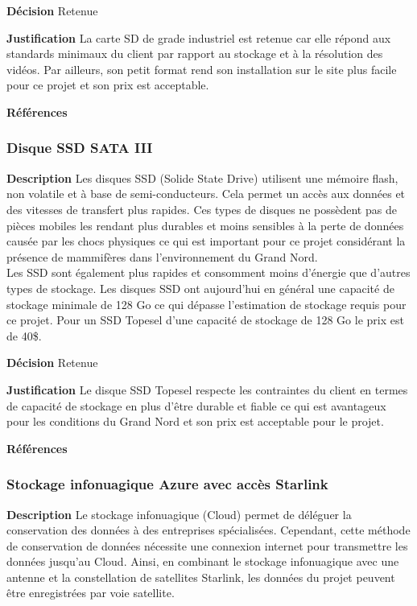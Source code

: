 \noindent\textbf{Décision} Retenue
\smallskip

\noindent\textbf{Justification} La carte SD de grade industriel est retenue car elle répond aux standards minimaux du client par rapport au stockage et à la résolution des vidéos. Par ailleurs, son petit format rend son installation sur le site plus facile pour ce projet et son prix est acceptable.
\smallskip


\noindent\textbf{Références}

\cite{CarteMicroSD1}
\cite{CarteMicroSD2}
\cite{CarteMicroSD3}



\subsubsection{Disque SSD SATA III}
\label{sec:ssd}
\noindent\textbf{Description} Les disques SSD (Solide State Drive) utilisent une mémoire flash, non volatile et à base de semi-conducteurs. Cela permet un accès aux données et des vitesses de transfert plus rapides. Ces types de disques ne possèdent pas de pièces mobiles les rendant plus durables et moins sensibles à la perte de données causée par les chocs physiques ce qui est important pour ce projet considérant la présence de mammifères dans l’environnement du Grand Nord. 
\\

Les SSD sont également plus rapides et consomment moins d’énergie que d’autres types de stockage. Les disques SSD ont aujourd’hui en général une capacité de stockage minimale de 128 Go ce qui dépasse l’estimation de stockage requis pour ce projet. Pour un SSD Topesel d’une capacité de stockage de 128 Go le prix est de 40\$.
\smallskip

\noindent\textbf{Décision} Retenue
\smallskip

\noindent\textbf{Justification} Le disque SSD Topesel respecte les contraintes du client en termes de capacité de stockage en plus d’être durable et fiable ce qui est avantageux pour les conditions du Grand Nord et son prix est acceptable pour le projet.
\smallskip

\noindent\textbf{Références}

\cite{DisqueSSD1} \cite{DisqueSSD2} \cite{DisqueSSD3}



\subsubsection{Stockage infonuagique Azure avec accès Starlink}
\label{sec:azsta}
\noindent\textbf{Description} Le stockage infonuagique (Cloud) permet de déléguer la conservation des données à des entreprises spécialisées. Cependant, cette méthode de conservation de données nécessite une connexion internet pour transmettre les données jusqu’au Cloud. Ainsi, en combinant le stockage infonuagique avec une antenne et la constellation de satellites Starlink, les données du projet peuvent être enregistrées par voie satellite. 
\\

